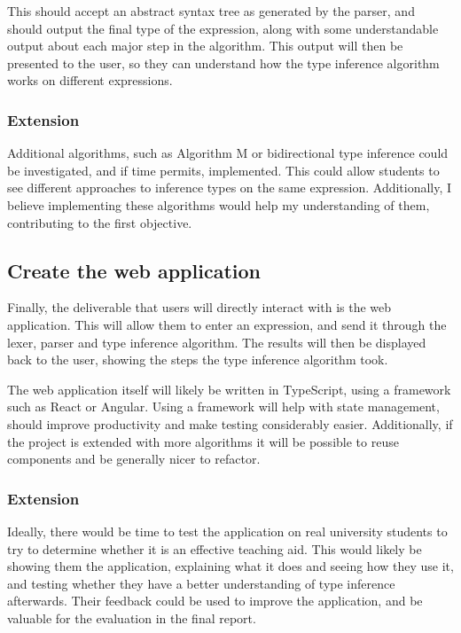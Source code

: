 \documentclass[12pt]{article}
\begin{document}
This should accept an abstract syntax tree as generated by the parser, and should output the final type of the expression, along with some understandable output about each major step in the algorithm. This output will then be presented to the user, so they can understand how the type inference algorithm works on different expressions.

\subsubsection{Extension}

Additional algorithms, such as Algorithm M or bidirectional type inference could be investigated, and if time permits, implemented. This could allow students to see different approaches to inference types on the same expression. Additionally, I believe implementing these algorithms would help my understanding of them, contributing to the first objective.

\subsection{Create the web application}

Finally, the deliverable that users will directly interact with is the web application. This will allow them to enter an expression, and send it through the lexer, parser and type inference algorithm. The results will then be displayed back to the user, showing the steps the type inference algorithm took.

The web application itself will likely be written in TypeScript, using a framework such as React or Angular. Using a framework will help with state management, should improve productivity and make testing considerably easier. Additionally, if the project is extended with more algorithms it will be possible to reuse components and be generally nicer to refactor.

\subsubsection{Extension}

Ideally, there would be time to test the application on real university students to try to determine whether it is an effective teaching aid. This would likely be showing them the application, explaining what it does and seeing how they use it, and testing whether they have a better understanding of type inference afterwards. Their feedback could be used to improve the application, and be valuable for the evaluation in the final report.
\end{document}

